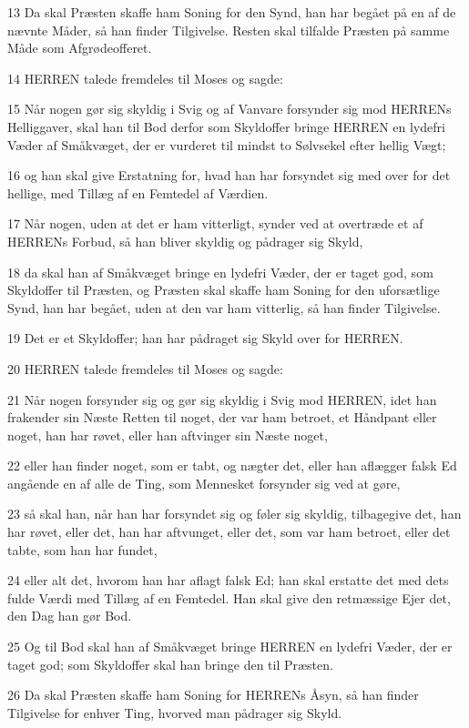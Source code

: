 \par 13 Da skal Præsten skaffe ham Soning for den Synd, han har begået på en af de nævnte Måder, så han finder Tilgivelse. Resten skal tilfalde Præsten på samme Måde som Afgrødeofferet.
\par 14 HERREN talede fremdeles til Moses og sagde:
\par 15 Når nogen gør sig skyldig i Svig og af Vanvare forsynder sig mod HERRENs Helliggaver, skal han til Bod derfor som Skyldoffer bringe HERREN en lydefri Væder af Småkvæget, der er vurderet til mindst to Sølvsekel efter hellig Vægt;
\par 16 og han skal give Erstatning for, hvad han har forsyndet sig med over for det hellige, med Tillæg af en Femtedel af Værdien.
\par 17 Når nogen, uden at det er ham vitterligt, synder ved at overtræde et af HERRENs Forbud, så han bliver skyldig og pådrager sig Skyld,
\par 18 da skal han af Småkvæget bringe en lydefri Væder, der er taget god, som Skyldoffer til Præsten, og Præsten skal skaffe ham Soning for den uforsætlige Synd, han har begået, uden at den var ham vitterlig, så han finder Tilgivelse.
\par 19 Det er et Skyldoffer; han har pådraget sig Skyld over for HERREN.
\par 20 HERREN talede fremdeles til Moses og sagde:
\par 21 Når nogen forsynder sig og gør sig skyldig i Svig mod HERREN, idet han frakender sin Næste Retten til noget, der var ham betroet, et Håndpant eller noget, han har røvet, eller han aftvinger sin Næste noget,
\par 22 eller han finder noget, som er tabt, og nægter det, eller han aflægger falsk Ed angående en af alle de Ting, som Mennesket forsynder sig ved at gøre,
\par 23 så skal han, når han har forsyndet sig og føler sig skyldig, tilbagegive det, han har røvet, eller det, han har aftvunget, eller det, som var ham betroet, eller det tabte, som han har fundet,
\par 24 eller alt det, hvorom han har aflagt falsk Ed; han skal erstatte det med dets fulde Værdi med Tillæg af en Femtedel. Han skal give den retmæssige Ejer det, den Dag han gør Bod.
\par 25 Og til Bod skal han af Småkvæget bringe HERREN en lydefri Væder, der er taget god; som Skyldoffer skal han bringe den til Præsten.
\par 26 Da skal Præsten skaffe ham Soning for HERRENs Åsyn, så han finder Tilgivelse for enhver Ting, hvorved man pådrager sig Skyld.

